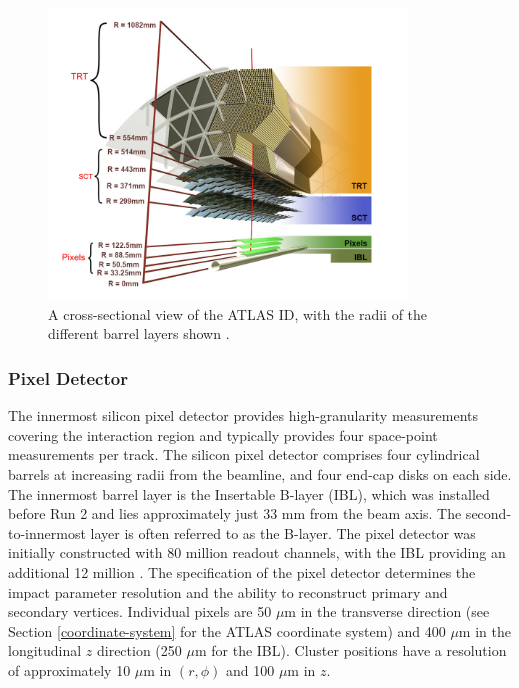 \begin{figure}[!htbp]
  \centering
  \includegraphics[width=0.85\textwidth]{images/2-LHC-ATLAS/atlas_id_xs.png}
  \caption{
    A cross-sectional view of the ATLAS ID, with the radii of the different barrel layers shown \cite{atlastrackingdocs}.
  }
  \label{fig:atlas-id-run2}
\end{figure}

\subsubsection{Pixel Detector}

The innermost silicon pixel detector \cite{pixel} provides high-granularity measurements covering the interaction region and typically provides four space-point measurements per track. The silicon pixel detector comprises four cylindrical barrels at increasing radii from the beamline, and four end-cap disks on each side. The innermost barrel layer is the Insertable B-layer (IBL), which was installed before Run 2 \cite{ATLAS-TDR-19,PIX-2018-001} and lies approximately just 33 mm from the beam axis. The second-to-innermost layer is often referred to as the B-layer. The pixel detector was initially constructed with 80 million readout channels, with the IBL providing an additional 12 million \cite{ibl}. The specification of the pixel detector determines the impact parameter resolution and the ability to reconstruct primary and secondary vertices. Individual pixels are 50 $\mu$m in the transverse direction (see Section \ref{coordinate-system} for the ATLAS coordinate system) and 400 $\mu$m in the longitudinal $z$ direction (250 $\mu$m for the IBL). Cluster positions have a resolution of approximately 10 $\mu$m in $(r,\phi)$ and 100 $\mu$m in $z$.


